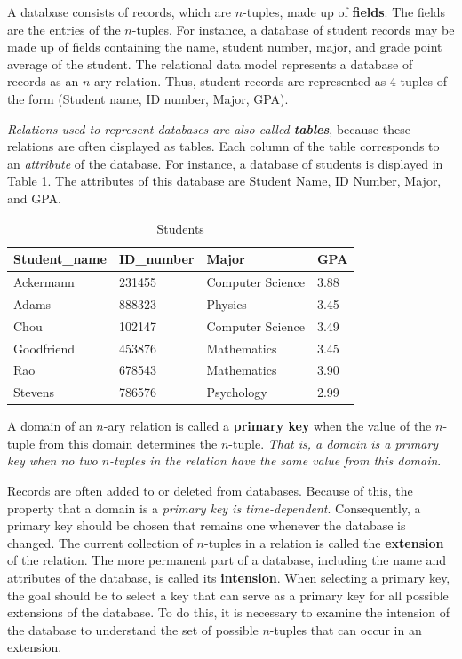 \documentclass[11pt]{article}
\begin{document}
A database consists of records, which are $n$-tuples, made up of \textbf{fields}. The fields are the entries of the $n$-tuples. 
For instance, a database of student records may be made up of fields containing the name, student number, major, and grade point average of the student. The relational data model represents a database of records as an $n$-ary relation. Thus, student records are represented as 4-tuples of the form (Student name, ID number, Major, GPA).

\textit{Relations used to represent databases are also called \textbf{tables}}, because these relations are often displayed as tables. Each column of the table corresponds to an \textit{attribute} of the database. For instance, a database of students is displayed in Table 1. The attributes of this database
are Student Name, ID Number, Major, and GPA.

\begin{table}[h!]
    \centering
    \caption{Students}
    \begin{tabular}{|l|l|l|l|}
    \hline
        Student\_name    & ID\_number    & Major               & GPA    \\ \hline
        Ackermann        & 231455        & Computer Science    & 3.88   \\ \hline
        Adams            & 888323        & Physics             & 3.45   \\ \hline
        Chou             & 102147        & Computer Science    & 3.49   \\ \hline
        Goodfriend       & 453876        & Mathematics         & 3.45   \\ \hline
        Rao              & 678543        & Mathematics         & 3.90   \\ \hline
        Stevens          & 786576        & Psychology          & 2.99   \\ \hline
    \end{tabular}
    \label{Table 1}
\end{table}

A domain of an $n$-ary relation is called a \textbf{primary key} when the value of the $n$-tuple from this domain determines the $n$-tuple. \textit{That is, a domain is a primary key when no two $n$-tuples in the relation have the same value from this domain}.

\newpage
Records are often added to or deleted from databases. Because of this, the property that a domain is a \textit{primary key is time-dependent}. Consequently, a primary key should be chosen that remains one whenever the database is changed. The current collection of $n$-tuples in a relation is called the \textbf{extension} of the relation. The more permanent part of a database, including the name and attributes of the database, is called its \textbf{intension}. When selecting a primary key, the goal should be to select a key that can serve as a primary key for all possible extensions of the database. To do this, it is necessary to examine the intension of the database to understand the set of possible $n$-tuples that can occur in an extension.
\end{document}
